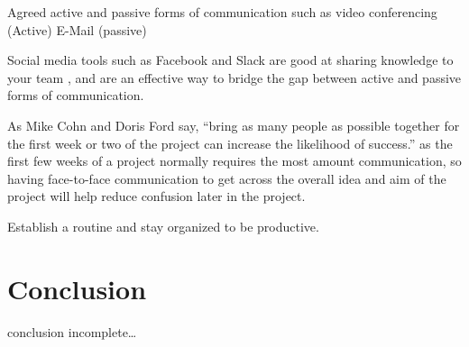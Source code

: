 \documentclass{scrartcl}
\begin{document}
Agreed active and passive forms of communication such as video conferencing (Active) E-Mail (passive) \cite{joshi2013}

Social media tools such as Facebook and Slack are good at sharing knowledge to your team \cite{Agile-on-the-beach-cite}, and are an effective way to bridge the gap between active and passive forms of communication.

As Mike Cohn and Doris Ford say, ``bring as many people as possible together for the first week or two of the project can increase the likelihood of success.'' \cite{cohn2003} as the first few weeks of a project normally requires the most amount communication, so having face-to-face communication to get across the overall idea and aim of the project will help reduce confusion later in the project.

Establish a routine and stay organized to be productive. \cite{OllyBrandLiveBlog2015}










\section{Conclusion}

conclusion incomplete\ldots




\end{document}
